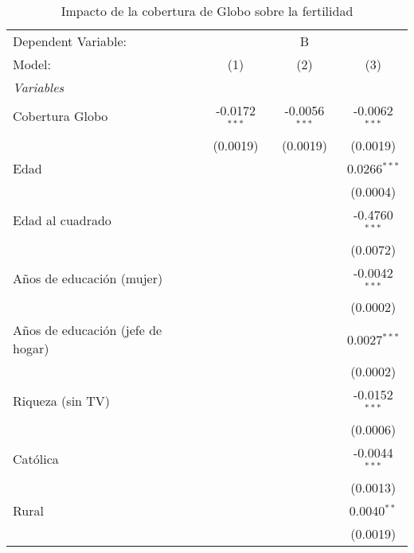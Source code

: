 \begin{table}[htbp]
   \caption{Impacto de la cobertura de Globo sobre la fertilidad}
   \centering
   \begin{tabular}{lccc}
      \tabularnewline \midrule \midrule
      Dependent Variable: & \multicolumn{3}{c}{B}\\
      Model:                            & (1)             & (2)             & (3)\\  
      \midrule
      \emph{Variables}\\
      Cobertura Globo                   & -0.0172$^{***}$ & -0.0056$^{***}$ & -0.0062$^{***}$\\   
                                        & (0.0019)        & (0.0019)        & (0.0019)\\   
      Edad                              &                 &                 & 0.0266$^{***}$\\   
                                        &                 &                 & (0.0004)\\   
      Edad al cuadrado                  &                 &                 & -0.4760$^{***}$\\   
                                        &                 &                 & (0.0072)\\   
      Años de educación (mujer)         &                 &                 & -0.0042$^{***}$\\   
                                        &                 &                 & (0.0002)\\   
      Años de educación (jefe de hogar) &                 &                 & 0.0027$^{***}$\\   
                                        &                 &                 & (0.0002)\\   
      Riqueza (sin TV)                  &                 &                 & -0.0152$^{***}$\\   
                                        &                 &                 & (0.0006)\\   
      Católica                          &                 &                 & -0.0044$^{***}$\\   
                                        &                 &                 & (0.0013)\\   
      Rural                             &                 &                 & 0.0040$^{**}$\\   
                                        &                 &                 & (0.0019)\\   

\end{tabular}
\end{table}
